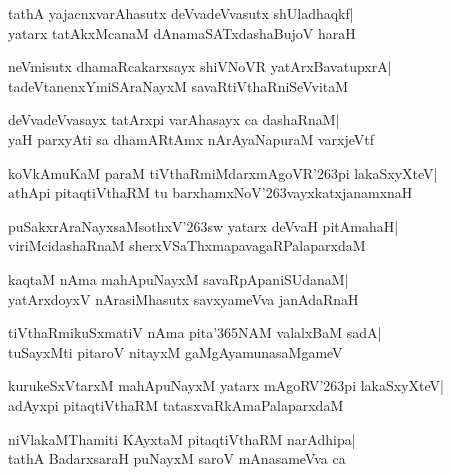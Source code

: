 \documentclass[twoside,12pt,openright]{book}
\def\S{\char'263}
\newcounter{shloka}[chapter]
\begin{document}
\begin{shloka}%
tathA yajacnxvarAhasutx deVvadeVvasutx shUladhaqkf|\\
yatarx tatAkxMcanaM dAnamaSATxdashaBujoV haraH
\end{shloka}

\begin{shloka}%
neVmisutx dhamaRcakarxsayx shiVNoVR yatArxBavatupxrA|\\
tadeVtanenxYmiSAraNayxM savaRtiVthaRniSeVvitaM
\end{shloka}

\begin{shloka}%
deVvadeVvasayx tatArxpi varAhasayx ca dashaRnaM|\\
yaH parxyAti sa dhamARtAmx nArAyaNapuraM varxjeVtf
\end{shloka}

\begin{shloka}%
koVkAmuKaM paraM tiVthaRmiMdarxmAgoVR\S pi lakaSxyXteV|\\
athApi pitaqtiVthaRM tu barxhamxNoV\S vayxkatxjanamxnaH
\end{shloka}

\begin{shloka}%
puSakxrAraNayxsaMsothxV\S sw yatarx deVvaH pitAmahaH|\\
viriMcidashaRnaM sherxVSaThxmapavagaRPalaparxdaM
\end{shloka}

\begin{shloka}%
kaqtaM nAma mahApuNayxM savaRpApaniSUdanaM|\\
yatArxdoyxV nArasiMhasutx savxyameVva janAdaRnaH
\end{shloka}

\begin{shloka}%
tiVthaRmikuSxmatiV nAma pita\char'365NAM valalxBaM sadA|\\
tuSayxMti pitaroV nitayxM gaMgAyamunasaMgameV
\end{shloka}

\begin{shloka}%
kurukeSxVtarxM mahApuNayxM yatarx mAgoRV\S pi lakaSxyXteV|\\
adAyxpi pitaqtiVthaRM tatasxvaRkAmaPalaparxdaM
\end{shloka}

\begin{shloka}%
niVlakaMThamiti KAyxtaM pitaqtiVthaRM narAdhipa|\\
tathA BadarxsaraH puNayxM saroV mAnasameVva ca
\end{shloka}
\end{document}
